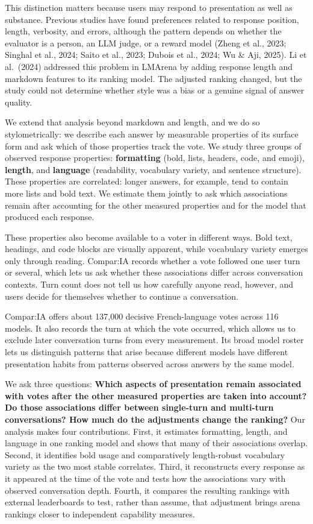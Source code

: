 \documentclass[
]{article}
\begin{document}
This distinction matters because users may respond to presentation as
well as substance. Previous studies have found preferences related to
response position, length, verbosity, and errors, although the pattern
depends on whether the evaluator is a person, an LLM judge, or a reward
model (Zheng et al., 2023; Singhal et al., 2024; Saito et al., 2023;
Dubois et al., 2024; Wu \& Aji, 2025). Li et al.~(2024) addressed this
problem in LMArena by adding response length and markdown features to
its ranking model. The adjusted ranking changed, but the study could not
determine whether style was a bias or a genuine signal of answer
quality.

We extend that analysis beyond markdown and length, and we do so
stylometrically: we describe each answer by measurable properties of its
surface form and ask which of those properties track the vote. We study
three groups of observed response properties: \textbf{formatting} (bold,
lists, headers, code, and emoji), \textbf{length}, and \textbf{language}
(readability, vocabulary variety, and sentence structure). These
properties are correlated: longer answers, for example, tend to
contain more lists and bold text. We estimate them jointly to ask which
associations remain after accounting for the other measured properties
and for the model that produced each response.

These properties also become available to a voter in different ways.
Bold text, headings, and code blocks are visually apparent, while
vocabulary variety emerges only through reading. Compar:IA records
whether a vote followed one user turn or several, which lets us ask
whether these associations differ across conversation contexts. Turn
count does not tell us how carefully anyone read, however, and users
decide for themselves whether to continue a conversation.

Compar:IA offers about 137,000 decisive French-language votes across 116
models. It also records the turn at which the vote occurred, which
allows us to exclude later conversation turns from every measurement.
Its broad model roster lets us distinguish patterns that arise because
different models have different presentation habits from patterns
observed across answers by the same model.

We ask three questions: \textbf{Which aspects of presentation remain
associated with votes after the other measured properties are taken
into account? Do those associations differ between single-turn and
multi-turn conversations? How much do the adjustments change the
ranking?} Our analysis makes four contributions. First, it estimates
formatting, length, and language in one ranking model and shows that many
of their associations overlap. Second, it identifies bold usage and
comparatively length-robust vocabulary variety as the two most stable
correlates. Third, it reconstructs every response as it appeared at the
time of the vote and tests how the associations vary with observed
conversation depth. Fourth, it compares the resulting rankings with
external leaderboards to test, rather than assume, that adjustment
brings arena rankings closer to independent capability measures.
\end{document}
